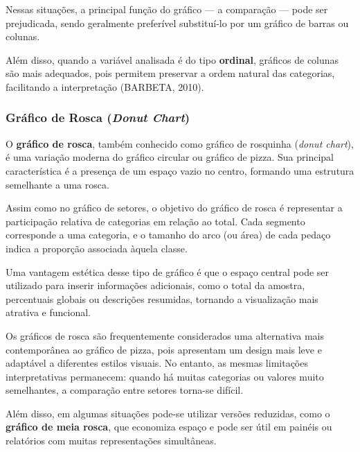 Nessas situações, a principal função do gráfico --- a comparação --- pode ser
prejudicada, sendo geralmente preferível substituí-lo por um gráfico de barras
ou colunas. \vskip0.3cm

Além disso, quando a variável analisada é do tipo \textbf{ordinal}, gráficos
de colunas são mais adequados, pois permitem preservar a ordem natural das
categorias, facilitando a interpretação (BARBETA, 2010).

\newpage
\subsubsection{Gráfico de Rosca (\textit{Donut Chart})}

O \textbf{gráfico de rosca}, também conhecido como gráfico de rosquinha
(\textit{donut chart}), é uma variação moderna do gráfico circular ou gráfico
de pizza. Sua principal característica é a presença de um espaço vazio no
centro, formando uma estrutura semelhante a uma rosca. \vskip0.3cm

Assim como no gráfico de setores, o objetivo do gráfico de rosca é representar
a participação relativa de categorias em relação ao total. Cada segmento
corresponde a uma categoria, e o tamanho do arco (ou área) de cada pedaço
indica a proporção associada àquela classe. \vskip0.3cm

Uma vantagem estética desse tipo de gráfico é que o espaço central pode ser
utilizado para inserir informações adicionais, como o total da amostra,
percentuais globais ou descrições resumidas, tornando a visualização mais
atrativa e funcional. \vskip0.3cm

Os gráficos de rosca são frequentemente considerados uma alternativa mais
contemporânea ao gráfico de pizza, pois apresentam um design mais leve e
adaptável a diferentes estilos visuais. No entanto, as mesmas limitações
interpretativas permanecem: quando há muitas categorias ou valores muito
semelhantes, a comparação entre setores torna-se difícil. \vskip0.3cm

Além disso, em algumas situações pode-se utilizar versões reduzidas, como o
\textbf{gráfico de meia rosca}, que economiza espaço e pode ser útil em painéis
ou relatórios com muitas representações simultâneas.


\newpage
